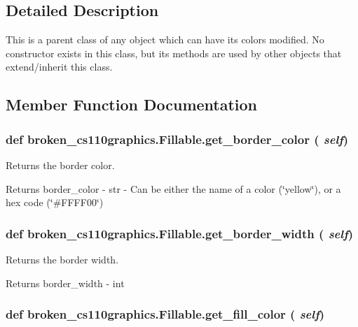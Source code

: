 \subsection{Detailed Description}
This is a parent class of any object which can have its colors modified. No constructor exists in this class, but its methods are used by other objects that extend/inherit this class. 

\subsection{Member Function Documentation}
\hypertarget{classbroken__cs110graphics_1_1Fillable_a7c3dcd0d73f232a957625eaba8234b3a}{
\subsubsection[{get\_\-border\_\-color}]{\setlength{\rightskip}{0pt plus 5cm}def broken\_\-cs110graphics.Fillable.get\_\-border\_\-color ( {\em self})}}
\label{classbroken__cs110graphics_1_1Fillable_a7c3dcd0d73f232a957625eaba8234b3a}


Returns the border color. \begin{DoxyReturn}{Returns}
border\_\-color -\/ str -\/ Can be either the name of a color (\char`\"{}yellow\char`\"{}), or a hex code (\char`\"{}\#FFFF00\char`\"{}) 
\end{DoxyReturn}
\hypertarget{classbroken__cs110graphics_1_1Fillable_aecaa099bdf059939148239f544ffd343}{
\subsubsection[{get\_\-border\_\-width}]{\setlength{\rightskip}{0pt plus 5cm}def broken\_\-cs110graphics.Fillable.get\_\-border\_\-width ( {\em self})}}
\label{classbroken__cs110graphics_1_1Fillable_aecaa099bdf059939148239f544ffd343}


Returns the border width. \begin{DoxyReturn}{Returns}
border\_\-width -\/ int 
\end{DoxyReturn}
\hypertarget{classbroken__cs110graphics_1_1Fillable_a1bedec36e0545af2c2765c5727178e1c}{
\subsubsection[{get\_\-fill\_\-color}]{\setlength{\rightskip}{0pt plus 5cm}def broken\_\-cs110graphics.Fillable.get\_\-fill\_\-color ( {\em self})}}
\label{classbroken__cs110graphics_1_1Fillable_a1bedec36e0545af2c2765c5727178e1c}


